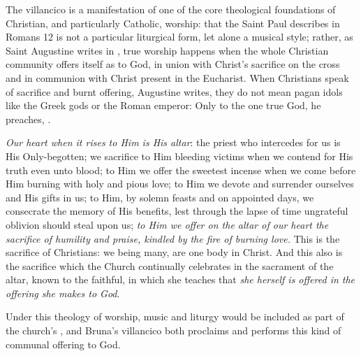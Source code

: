 The villancico is a manifestation of one of the core theological foundations of
Christian, and particularly Catholic, worship: that the  Saint Paul describes in Romans 12 is not a particular liturgical form,
let alone a musical style; rather, as Saint Augustine writes in , true worship happens when the whole Christian community offers
itself as  to God, in union with Christ's sacrifice
on the cross and in communion with Christ present in the Eucharist.
When Christians speak of sacrifice and burnt offering, Augustine writes, they
do not mean pagan idols like the Greek gods or the Roman emperor: Only to the
one true God, he preaches, .%
    \Autocite[10:3]{Augustine:CityofGod}
\begin{quoting}
    \emph{Our heart when it rises to Him is His altar}: the priest who
    intercedes for us is His Only-begotten; we sacrifice to Him bleeding
    victims when we contend for His truth even unto blood; to Him we offer the
    sweetest incense when we come before Him burning with holy and pious love;
    to Him we devote and surrender ourselves and His gifts in us; to Him, by
    solemn feasts and on appointed days, we consecrate the memory of His
    benefits, lest through the lapse of time ungrateful oblivion should steal
    upon us; \emph{to Him we offer on the altar of our heart the sacrifice of
    humility and praise, kindled by the fire of burning love.}
    This is the sacrifice of Christians: we being many, are one body in Christ.
    And this also is the sacrifice which the Church continually celebrates in
    the sacrament of the altar, known to the faithful, in which she teaches
    that \emph{she herself is offered in the offering she makes to God}.%
        \Autocite[10:6, emphasis added]{Augustine:CityofGod}
\end{quoting}
Under this theology of worship, music and liturgy would be included as part of
the church's , and Bruna's
villancico both proclaims and performs this kind of communal offering to God.

